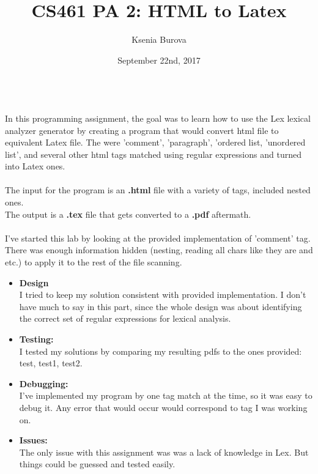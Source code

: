 \documentclass[12pt, letterpaper]{article}
\title{CS461 PA 2: HTML to Latex }
\author{Ksenia Burova}
\date{September 22nd, 2017}
\begin{document}
 
\maketitle

\\
In this programming assignment, the goal was to learn how to use the Lex lexical analyzer generator by creating a program that would convert html file to equivalent Latex file. The were 'comment', 'paragraph', 'ordered list, 'unordered list', and several other html tags matched using regular expressions and turned into Latex ones. \\

\\
The input for the program is an {\bf .html}  file with a variety of tags, included nested ones.\\
The output is a {\bf .tex} file that gets converted to a {\bf .pdf} aftermath.\\

\\
I've started this lab by looking at the provided implementation of 'comment' tag. There was enough information hidden (nesting, reading all chars like they are and etc.) to apply it to the rest of the file scanning.

\begin{itemize}
	\item {\bf Design} \\
	I tried to keep my solution consistent with provided implementation. I don't have much to say in this part, since the whole design was about identifying the correct set of regular expressions for lexical analysis. 
	\item {\bf Testing:} \\
	I tested my solutions by comparing my resulting pdfs to the ones provided: test, test1, test2.
	\item {\bf Debugging:} \\
	I've implemented my program by one tag match at the time, so it was easy to debug it. Any error that would occur would correspond to tag I was working on.
	 \item {\bf Issues:} \\
	The only issue with this assignment was was a lack of knowledge in Lex. But things could be guessed and tested easily. 
\end{itemize}
\end{document}

